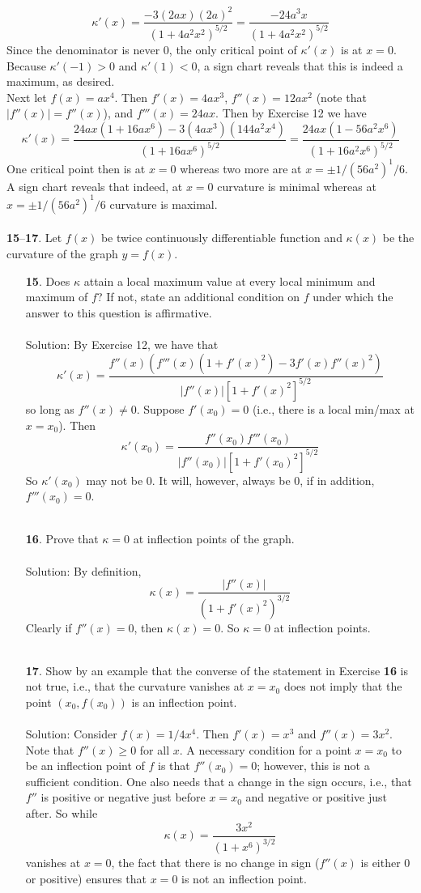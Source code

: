\documentclass[12pt]{amsbook}
\begin{document}
$$\kappa'(x)=\frac{-3(2ax)(2a)^2}{(1+4a^2x^2)^{5/2}}=\frac{-24a^3x}{(1+4a^2x^2)^{5/2}}$$
Since the denominator is never $0$, the only critical point of $\kappa'(x)$ is at $x=0$. Because $\kappa'(-1)>0$ and $\kappa'(1)<0$, a sign chart reveals that this is indeed a maximum, as desired. 
\\
Next let $f(x)=ax^4$. Then $f'(x)=4ax^3$, $f''(x)=12ax^2$ (note that $|f''(x)|=f''(x)$), and $f'''(x)=24ax$. Then by Exercise 12 we have
$$\kappa'(x)=\frac{24ax(1+16ax^6)-3(4ax^3)(144a^2x^4)}{(1+16ax^6)^{5/2}}=\frac{24ax(1-56a^2x^6)}{(1+16a^2x^6)^{5/2}}$$
One critical point then is at $x=0$ whereas two more are at $x=\pm 1/(56a^2)^1/6$. A sign chart reveals that indeed, at $x=0$ curvature is minimal whereas at $x=\pm 1/(56a^2)^1/6$ curvature is maximal.
\\
\\
\noindent
{\small {\bf 15}--{\bf 17}}. Let $f(x)$ be twice continuously differentiable function and $\kappa(x)$ be the curvature of the graph $y = f(x)$.
\begin{enumerate}
  \item[{\small\bf 15}.] Does $\kappa$ attain a local maximum value at every local minimum and
maximum of $f$? If not, state an additional condition on $f$ under which the answer to this question is affirmative.
\\
\\
{\sc Solution}: By Exercise 12, we have that
$$\kappa'(x)=\frac{f''(x)(f'''(x)(1+f'(x)^2)-3f'(x)f''(x)^2)}{|f''(x)|[1+f'(x)^2]^{5/2}}$$
so long as $f''(x) \neq 0$. Suppose $f'(x_0)=0$ (i.e., there is a local min/max at $x=x_0$). Then 
$$\kappa'(x_0)=\frac{f''(x_0)f'''(x_0)}{|f''(x_0)|[1+f'(x_0)^2]^{5/2}}$$
So $\kappa'(x_0)$ may not be $0$. It will, however, always be $0$, if in addition, $f'''(x_0)=0$. 
\\
\\
  \item[{\small\bf 16}.] Prove that $\kappa=0$ at inflection points of the graph.
  \\
\\
{\sc Solution}: By definition,
$$\kappa(x)=\frac{|f''(x)|}{(1+f'(x)^2)^{3/2}}$$
Clearly if $f''(x)=0$, then $\kappa(x)=0$. So $\kappa=0$ at inflection points.
\\
\\
  \item[{\small\bf 17}.] Show by an example that the converse of the statement in Exercise
{\bf 16} is not true, i.e., that the curvature vanishes at $x = x_0$ does not
imply that the point $(x_0, f(x_0))$ is an inflection point.
\\
\\
{\sc Solution}: Consider $f(x)=1/4x^4$. Then $f'(x)=x^3$ and $f''(x)=3x^2$. Note that $f''(x) \geq 0$ for all $x$. A necessary condition for a point $x=x_0$ to be an inflection point of $f$ is that $f''(x_0)=0$; however, this is not a sufficient condition. One also needs that a change in the sign occurs, i.e., that $f''$ is positive or negative just before $x=x_0$ and negative or positive just after. So while 
$$\kappa(x)=\frac{3x^2}{(1+x^6)^{3/2}}$$
vanishes at $x=0$, the fact that there is no change in sign ($f''(x)$ is either $0$ or positive) ensures that $x=0$ is not an inflection point.
\end{enumerate}
\end{document}
